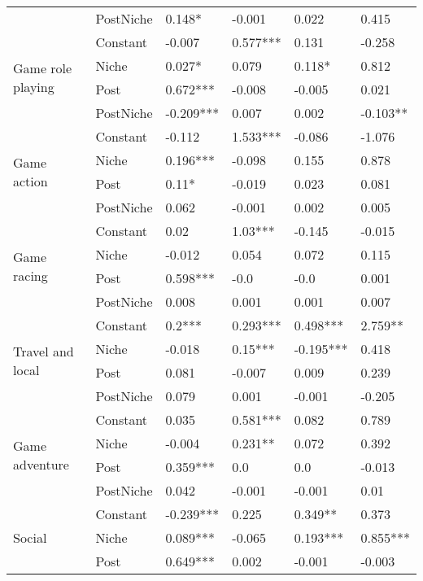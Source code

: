 \begin{table}[h!]
\begin{tabular}{llllll}
          & PostNiche &  0.148* &  -0.001 &  0.022 &  0.415 \\
\cline{1-6}
\multirow{4}{*}{Game role playing} & Constant &  -0.007 &  0.577*** &  0.131 &  -0.258 \\
          & Niche &  0.027* &  0.079 &  0.118* &  0.812 \\
          & Post &  0.672*** &  -0.008 &  -0.005 &  0.021 \\
          & PostNiche &  -0.209*** &  0.007 &  0.002 &  -0.103** \\
\cline{1-6}
\multirow{4}{*}{Game action} & Constant &  -0.112 &  1.533*** &  -0.086 &  -1.076 \\
          & Niche &  0.196*** &  -0.098 &  0.155 &  0.878 \\
          & Post &  0.11* &  -0.019 &  0.023 &  0.081 \\
          & PostNiche &  0.062 &  -0.001 &  0.002 &  0.005 \\
\cline{1-6}
\multirow{4}{*}{Game racing} & Constant &  0.02 &  1.03*** &  -0.145 &  -0.015 \\
          & Niche &  -0.012 &  0.054 &  0.072 &  0.115 \\
          & Post &  0.598*** &  -0.0 &  -0.0 &  0.001 \\
          & PostNiche &  0.008 &  0.001 &  0.001 &  0.007 \\
\cline{1-6}
\multirow{4}{*}{Travel and local} & Constant &  0.2*** &  0.293*** &  0.498*** &  2.759** \\
          & Niche &  -0.018 &  0.15*** &  -0.195*** &  0.418 \\
          & Post &  0.081 &  -0.007 &  0.009 &  0.239 \\
          & PostNiche &  0.079 &  0.001 &  -0.001 &  -0.205 \\
\cline{1-6}
\multirow{4}{*}{Game adventure} & Constant &  0.035 &  0.581*** &  0.082 &  0.789 \\
          & Niche &  -0.004 &  0.231** &  0.072 &  0.392 \\
          & Post &  0.359*** &  0.0 &  0.0 &  -0.013 \\
          & PostNiche &  0.042 &  -0.001 &  -0.001 &  0.01 \\
\cline{1-6}
\multirow{4}{*}{Social} & Constant &  -0.239*** &  0.225 &  0.349** &  0.373 \\
          & Niche &  0.089*** &  -0.065 &  0.193*** &  0.855*** \\
          & Post &  0.649*** &  0.002 &  -0.001 &  -0.003 \\

\end{tabular}
\end{table}
